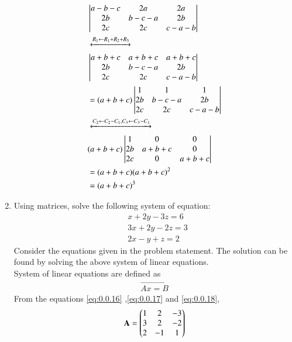 \documentclass[journal,12pt,twocolumn]{IEEEtran}
\renewcommand\thesection{\arabic{section}}
\begin{document}
\begin{enumerate}[label=\thesection.\arabic*.,ref=\thesection.\theenumi]
\solution
 \begin{align}
  &\begin{vmatrix}
    a-b-c & 2a& 2a\\ 2b& b-c-a& 2b\\2c&2c&c-a-b 
    \end{vmatrix}\\
& \xleftrightarrow[]{ R_1 \leftarrow R_1 + R_2+R_3}  \nonumber \\
&\begin{vmatrix} a+b+c & a+b+c& a+b+c \\ 2b& b-c-a& 2b\\2c&2c&c-a-b  \end{vmatrix}\\
  &= (a+b+c)\begin{vmatrix} 1 & 1 & 1\\ 2b& b-c-a& 2b\\2c&2c&c-a-b  \end{vmatrix}\\
   & \xleftrightarrow[]{ C_2 \leftarrow C_2- C_1 , C_3 \leftarrow C_3 - C_1} \nonumber \\
   &(a+b+c)\begin{vmatrix} 1 & 0 & 0\\ 2b& a+b+c& 0\\2c&0&a+b+c \end{vmatrix}\\
 &= (a+b+c)(a+b+c)^2  \\
 &= (a+b+c)^3 
  \end{align}
\item Using matrices, solve the following system of equation:
\begin{align}
   & x+2y-3z=6  \label{eq:0.0.16}  \\
   &  3x+2y-2z=3  \label{eq:0.0.17}\\
   &  2x-y+z=2   \label{eq:0.0.18}
\end{align}
\solution
Consider the equations given in the problem statement.
The solution can be found by solving the above system of linear equations.\\ 
System of linear equations are defined as 
\begin{align}
\vec{Ax=B} \label{eq:0.0.19}
\end{align}
From the equations \eqref{eq:0.0.16} ,\eqref{eq:0.0.17} and \eqref{eq:0.0.18}, 
\begin{align}
&\vec{A}= \myvec{1 &2 &-3\\3 & 2& -2\\2&-1&1} \\

\end{align}
\end{enumerate}
\end{document}
